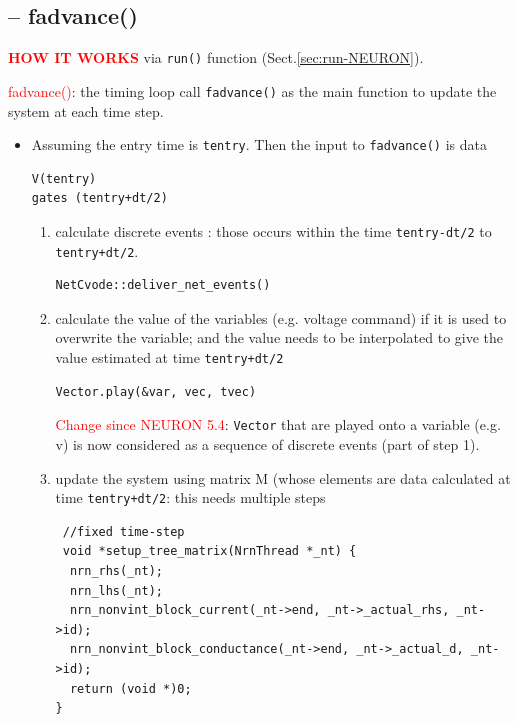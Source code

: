 \subsection{-- fadvance()}
\label{sec:fadvance-NEURON}

\textcolor{red}{\bf HOW IT WORKS} via \verb!run()! function
(Sect.\ref{sec:run-NEURON}).

\textcolor{red}{fadvance()}: the timing loop call \verb!fadvance()! as the main
function to update the system at each time step.
  
\begin{itemize}
  
  \item Assuming the entry time is \verb!tentry!. Then the input to
  \verb!fadvance()! is data
\begin{verbatim}
V(tentry)
gates (tentry+dt/2)
\end{verbatim}
  \begin{enumerate}
    \item calculate discrete events : those occurs within the time
   \verb!tentry-dt/2! to \verb!tentry+dt/2!.
   
\begin{verbatim}
NetCvode::deliver_net_events()
\end{verbatim} 

     \item calculate the value of the variables (e.g. voltage command) if it is
     used to overwrite the variable; and the value needs to be interpolated to
     give the value estimated at time \verb!tentry+dt/2!

\begin{verbatim}
Vector.play(&var, vec, tvec)
\end{verbatim}     

\textcolor{red}{Change since NEURON 5.4}: \verb!Vector! that are played onto a
variable (e.g. v) is now considered as a sequence of discrete events (part of
step 1). 

     \item update the system using matrix M (whose elements are data calculated
     at time \verb!tentry+dt/2!: this needs multiple steps
   
 \begin{verbatim}
 //fixed time-step
 void *setup_tree_matrix(NrnThread *_nt) {
  nrn_rhs(_nt);
  nrn_lhs(_nt);
  nrn_nonvint_block_current(_nt->end, _nt->_actual_rhs, _nt->id);
  nrn_nonvint_block_conductance(_nt->end, _nt->_actual_d, _nt->id);
  return (void *)0;
}
 \end{verbatim}  
 

\end{enumerate}
\end{itemize}
